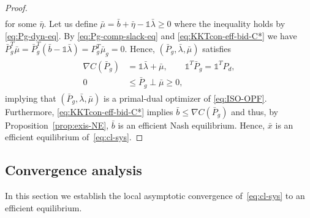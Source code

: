 \documentclass[journal]{IEEEtran}
\newcommand{\w}{\omega}
\newcommand{\1}{\mathds 1}
\newcommand{\vp}{\varphi}
\newcommand{\n}{\nabla}
\renewcommand{\l}{\lambda}
\DeclareMathOperator{\col}{col}
\theoremstyle{remark}
\theoremstyle{definition}
\begin{document}
\begin{proof}
\begin{align}
  \end{align}
  for some $\bar \eta$. Let us define $\bar
  \mu=\bar b+\bar \eta-\1\bar \l\geq 0$ where the inequality holds by
  \eqref{eq:Pg-dyn-eq}.  By \eqref{eq:Pg-comp-slack-eq} and
  \eqref{eq:KKTcon-eff-bid-C*} we have $\bar P_g^T\bar \mu=\bar
  P_g^T(\bar b-\1\bar \l)=P_g^T\bar \mu_g=0$.
  Hence, $(\bar P_g,\bar \l,\bar \mu)$ satisfies %
  \begin{align}\label{eq:KKTcon-sc2}
    \begin{aligned}
      \n C(\bar P_g)&=\1\bar \l+\bar \mu, \qquad \1^T\bar P_g=\1^TP_d,
      \\
      0&\leq \bar P_g\perp \bar \mu\geq 0,
    \end{aligned}
  \end{align}
  implying that $(\bar P_g,\bar \l,\bar \mu)$ is a primal-dual
  optimizer of \eqref{eq:ISO-OPF}.  Furthermore,
  \eqref{eq:KKTcon-eff-bid-C*} implies $\bar b\leq\nabla C(\bar P_g)$
  and thus, by Proposition~\ref{prop:exis-NE}, $\bar b$ is an
  efficient Nash equilibrium. Hence, $\bar x$ is an efficient
  equilibrium of~\eqref{eq:cl-sys}.
\end{proof}

\subsection{Convergence analysis}
In this section we establish the local asymptotic convergence
of~\eqref{eq:cl-sys} to an efficient equilibrium.
\end{document}

